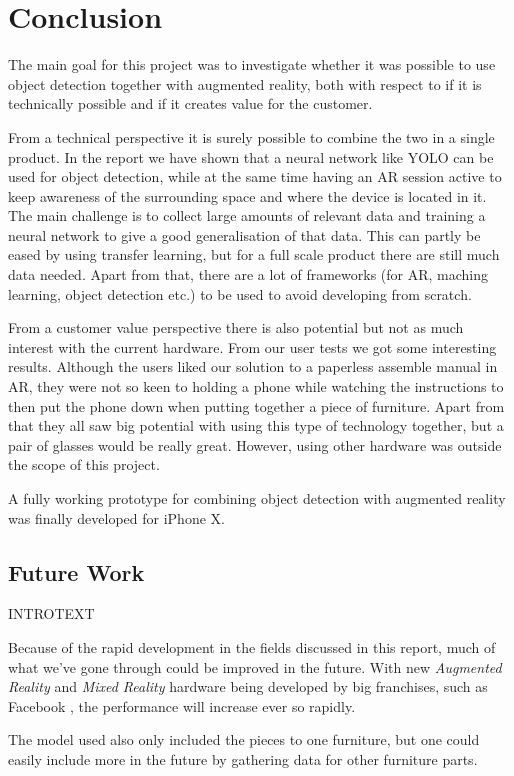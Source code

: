 \section{Conclusion}
The main goal for this project was to investigate whether it was possible to
use object detection together with augmented reality, both with respect to
if it is technically possible and if it creates value for the customer.

From a technical perspective it is surely possible to combine the two in a single
product. In the report we have shown that a neural network like
YOLO can be used for object detection, while at the same time having an AR 
session active to keep awareness of the surrounding space and where the device 
is located in it. The main challenge is to collect large amounts of relevant data and
training a neural network to give a good generalisation of that data. This can 
partly be eased by using transfer learning, but for a full scale product there are
still much data needed.
Apart from that, there are a lot of frameworks (for AR, maching learning, 
object detection etc.) to be used to avoid developing from scratch.

From a customer value perspective there is also potential but not as much
interest with the current hardware. From our user tests we got some interesting
results. Although the users liked our solution to a paperless assemble manual in
AR, they were not so keen to holding a phone while watching the instructions to
then put the phone down when putting together a piece of furniture.
Apart from that they all saw big potential with using this type of technology
together, but a pair of glasses would be really great. However, using other 
hardware was outside the scope of this project.

A fully working prototype for combining object detection with augmented reality
was finally developed for iPhone X.

\subsection{Future Work}
INTROTEXT

Because of the rapid development in the fields discussed in this report, much of what we've gone through could be improved in the future. With new \textit{Augmented Reality} and \textit{Mixed Reality} hardware being developed by big franchises, such as Facebook \cite{facebookAR}, the performance will increase ever so rapidly.

The model used also only included the pieces to one furniture, but one could easily include more in the future by gathering data for other furniture parts.

